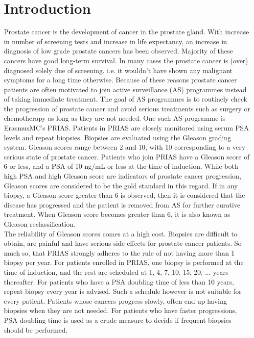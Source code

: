 
\section{Introduction}
\label{sec : introduction}
Prostate cancer is the development of cancer in the prostate gland. With increase in number of screening tests and increase in life expectancy, an increase in diagnosis of low grade prostate cancers has been observed. Majority of these cancers have good long-term survival. In many cases the prostate cancer is (over) diagnosed solely due of screening. i.e. it wouldn't have shown any malignant symptoms for a long time otherwise. Because of these reasons prostate cancer patients are often motivated to join active surveillance (AS) programmes instead of taking immediate treatment. The goal of AS programmes is to routinely check the progression of prostate cancer and avoid serious treatments such as surgery or chemotherapy as long as they are not needed. One such AS programme is ErasmusMC's PRIAS. Patients in PRIAS are closely monitored using serum PSA levels and repeat biopsies. Biopsies are evaluated using the Gleason grading system. Gleason scores range between 2 and 10, with 10 corresponding to a very serious state of prostate cancer. Patients who join PRIAS have a Gleason score of 6 or less, and a PSA of 10 ng/mL or less at the time of induction. While both high PSA and high Gleason score are indicators of prostate cancer progression, Gleason scores are considered to be the gold standard in this regard. If in any biopsy, a Gleason score greater than 6 is observed, then it is considered that the disease has progressed and the patient is removed from AS for further curative treatment. When Gleason score becomes greater than 6, it is also known as Gleason reclassification.\\

The reliability of Gleason scores comes at a high cost. Biopsies are difficult to obtain, are painful and have serious side effects for prostate cancer patients. So much so, that PRIAS strongly adheres to the rule of not having more than 1 biopsy per year. For patients enrolled in PRIAS, one biopsy is performed at the time of induction, and the rest are scheduled at 1, 4, 7, 10, 15, 20, ... years thereafter. For patients who have a PSA doubling time of less than 10 years, repeat biopsy every year is advised. Such a schedule however is not suitable for every patient. Patients whose cancers progress slowly, often end up having biopsies when they are not needed. For patients who have faster progressions, PSA doubling time is used as a crude measure to decide if frequent biopsies should be performed. \\


